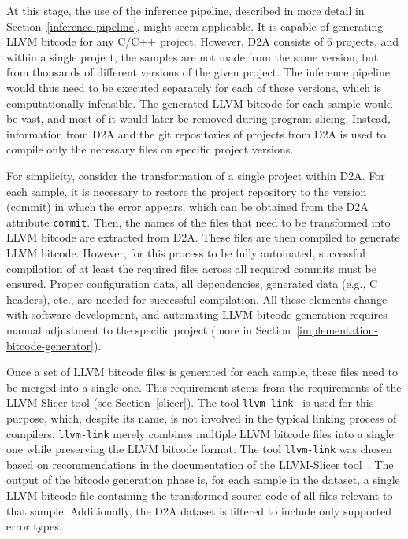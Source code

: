 At this stage, the use of the inference pipeline, described in more detail in Section~\ref{inference-pipeline}, might seem applicable. It is capable of generating LLVM bitcode for any C/C++ project. However, D2A consists of 6 projects, and within a single project, the samples are not made from the same version, but from thousands of different versions of the given project. The inference pipeline would thus need to be executed separately for each of these versions, which is computationally infeasible. The generated LLVM bitcode for each sample would be vast, and most of it would later be removed during program slicing. Instead, information from D2A and the git repositories of projects from D2A is used to compile only the necessary files on specific project versions.

For simplicity, consider the transformation of a single project within D2A. For each sample, it is necessary to restore the project repository to the version (commit) in which the error appears, which can be obtained from the D2A attribute \texttt{commit}. Then, the names of the files that need to be transformed into LLVM bitcode are extracted from D2A. These files are then compiled to generate LLVM bitcode. However, for this process to be fully automated, successful compilation of at least the required files across all required commits must be ensured. Proper configuration data, all dependencies, generated data (e.g., C headers), etc., are needed for successful compilation. All these elements change with software development, and automating LLVM bitcode generation requires manual adjustment to the specific project (more in Section~\ref{implementation-bitcode-generator}).

Once a set of LLVM bitcode files is generated for each sample, these files need to be merged into a single one. This requirement stems from the requirements of the LLVM-Slicer tool (see Section~\ref{slicer}). The tool \texttt{llvm-link}~\cite{llvm-link-doc} is used for this purpose, which, despite its name, is not involved in the typical linking process of compilers. \texttt{llvm-link} merely combines multiple LLVM bitcode files into a single one while preserving the LLVM bitcode format. The tool \texttt{llvm-link} was chosen based on recommendations in the documentation of the LLVM-Slicer tool~\cite{llvm-slicer-readme}. The output of the bitcode generation phase is, for each sample in the dataset, a single LLVM bitcode file containing the transformed source code of all files relevant to that sample. Additionally, the D2A dataset is filtered to include only supported error types.


